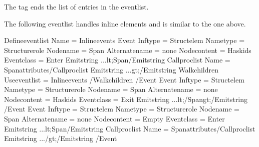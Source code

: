 \documentclass[letterpaper,12pt,english,openany,oneside]{sphinxmanual}
\begin{document}
The  tag ends the list of entries in the  event\sphinxhyphen{}list.

The following event\sphinxhyphen{}list handles inline elements and is similar to the one above.

\begin{sphinxVerbatim}[commandchars=\\\{\}]
\PYGZlt{}Define\PYGZhy{}event\PYGZhy{}list Name = \PYGZdq{}Inline\PYGZhy{}events\PYGZdq{}\PYGZgt{}
  \PYGZlt{}Event Inf\PYGZhy{}type = \PYGZdq{}Struct\PYGZhy{}elem\PYGZdq{} Name\PYGZhy{}type = \PYGZdq{}Structure\PYGZhy{}role\PYGZdq{}
                Node\PYGZhy{}name = \PYGZdq{}Span\PYGZdq{} Alternate\PYGZhy{}name = \PYGZdq{}\PYGZhy{}none\PYGZhy{}\PYGZdq{}
                Node\PYGZhy{}content = \PYGZdq{}Has\PYGZhy{}kids\PYGZdq{} Event\PYGZhy{}class = \PYGZdq{}Enter\PYGZdq{}\PYGZgt{}
          \PYGZlt{}Emit\PYGZhy{}string ...\PYGZgt{}\PYGZam{}lt;Span\PYGZlt{}/Emit\PYGZhy{}string\PYGZgt{}
          \PYGZlt{}Call\PYGZhy{}proc\PYGZhy{}list Name = \PYGZdq{}Span\PYGZhy{}attributes\PYGZdq{}\PYGZgt{}\PYGZlt{}/Call\PYGZhy{}proc\PYGZhy{}list\PYGZgt{}
          \PYGZlt{}Emit\PYGZhy{}string ...\PYGZgt{}\PYGZam{}gt;\PYGZlt{}/Emit\PYGZhy{}string\PYGZgt{}
          \PYGZlt{}Walk\PYGZhy{}children Use\PYGZhy{}event\PYGZhy{}list = \PYGZdq{}Inline\PYGZhy{}events\PYGZdq{}\PYGZgt{}
          \PYGZlt{}/Walk\PYGZhy{}children\PYGZgt{}
  \PYGZlt{}/Event\PYGZgt{}
  \PYGZlt{}Event Inf\PYGZhy{}type = \PYGZdq{}Struct\PYGZhy{}elem\PYGZdq{} Name\PYGZhy{}type = \PYGZdq{}Structure\PYGZhy{}role\PYGZdq{}
                Node\PYGZhy{}name = \PYGZdq{}Span\PYGZdq{} Alternate\PYGZhy{}name = \PYGZdq{}\PYGZhy{}none\PYGZhy{}\PYGZdq{}
                Node\PYGZhy{}content = \PYGZdq{}Has\PYGZhy{}kids\PYGZdq{} Event\PYGZhy{}class = \PYGZdq{}Exit\PYGZdq{}\PYGZgt{}
          \PYGZlt{}Emit\PYGZhy{}string ...\PYGZgt{}\PYGZam{}lt;/Span\PYGZam{}gt;\PYGZlt{}/Emit\PYGZhy{}string\PYGZgt{}
  \PYGZlt{}/Event\PYGZgt{}
  \PYGZlt{}Event Inf\PYGZhy{}type = \PYGZdq{}Struct\PYGZhy{}elem\PYGZdq{} Name\PYGZhy{}type = \PYGZdq{}Structure\PYGZhy{}role\PYGZdq{}
                Node\PYGZhy{}name = \PYGZdq{}Span\PYGZdq{} Alternate\PYGZhy{}name = \PYGZdq{}\PYGZhy{}none\PYGZhy{}\PYGZdq{}
                Node\PYGZhy{}content = \PYGZdq{}Empty\PYGZdq{} Event\PYGZhy{}class = \PYGZdq{}Enter\PYGZdq{}\PYGZgt{}
          \PYGZlt{}Emit\PYGZhy{}string ...\PYGZgt{}\PYGZam{}lt;Span\PYGZlt{}/Emit\PYGZhy{}string\PYGZgt{}
          \PYGZlt{}Call\PYGZhy{}proc\PYGZhy{}list Name = \PYGZdq{}Span\PYGZhy{}attributes\PYGZdq{}\PYGZgt{}\PYGZlt{}/Call\PYGZhy{}proc\PYGZhy{}list\PYGZgt{}
          \PYGZlt{}Emit\PYGZhy{}string ...\PYGZgt{}/\PYGZam{}gt;\PYGZlt{}/Emit\PYGZhy{}string\PYGZgt{}
  \PYGZlt{}/Event\PYGZgt{}
\end{sphinxVerbatim}
\end{document}

